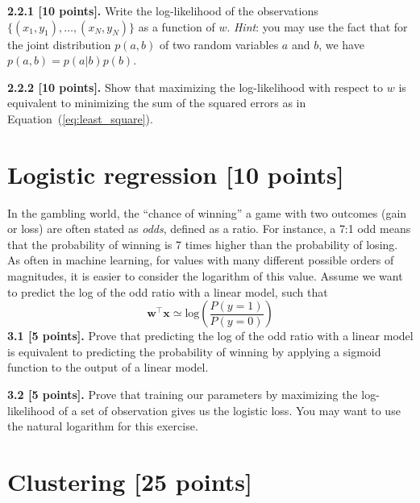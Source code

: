 \documentclass{article}
\begin{document}
\noindent\textbf{2.2.1 [10 points].} Write the log-likelihood of the observations $\{(x_1, y_1), \dots, (x_N,y_N)\}$ as a function of $w$. \textit{Hint}: you may use the fact that for the joint distribution $p(a,b)$ of two random variables $a$ and $b$, we have $p(a,b) = p(a|b)p(b)$.

\noindent\textbf{2.2.2 [10 points].} Show that maximizing the log-likelihood with respect to $w$ is equivalent to minimizing the sum of the squared errors as in Equation~(\ref{eq:least_square}).

\section{Logistic regression [10 points]}

In the gambling world, the ``chance of winning'' a game with two outcomes (gain or loss) are often stated as \textit{odds}, defined as a ratio. For instance, a 7:1 odd means that the probability of winning is 7 times higher than the probability of losing.
As often in machine learning, for values with many different possible orders of magnitudes, it is easier to consider the logarithm of this value.
Assume we want to predict the log of the odd ratio with a linear model, such that
\begin{equation}
\mathbf{w}^\top\mathbf{x} \simeq \text{log} \left( \frac{P(y=1)}{P(y=0)} \right)
\end{equation}
\noindent\textbf{3.1 [5 points].} Prove that predicting the log of the odd ratio with a linear model is equivalent to predicting the probability of winning by applying a sigmoid function to the output of a linear model.

\noindent\textbf{3.2 [5 points].} Prove that training our parameters by maximizing the log-likelihood of a set of observation gives us the logistic loss.
You may want to use the natural logarithm for this exercise.

\section{Clustering [25 points]}
\end{document}
